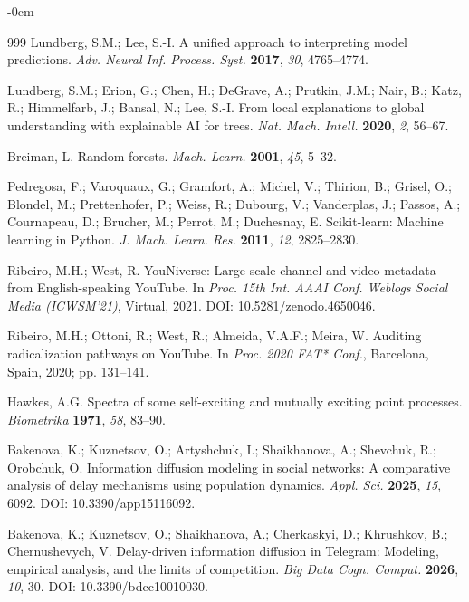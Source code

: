 \documentclass[journal,article,submit,pdftex,moreauthors]{Definitions/mdpi}
\begin{document}
\begin{adjustwidth}{-\extralength}{0cm}
\begin{thebibliography}{999}
Lundberg, S.M.; Lee, S.-I. A unified approach to interpreting model
predictions. {\em Adv. Neural Inf. Process. Syst.} {\bf 2017},
{\em 30}, 4765--4774.

Lundberg, S.M.; Erion, G.; Chen, H.; DeGrave, A.; Prutkin, J.M.;
Nair, B.; Katz, R.; Himmelfarb, J.; Bansal, N.; Lee, S.-I.
From local explanations to global understanding with explainable AI for
trees. {\em Nat. Mach. Intell.} {\bf 2020}, {\em 2}, 56--67.

Breiman, L. Random forests. {\em Mach. Learn.} {\bf 2001}, {\em 45},
5--32.

Pedregosa, F.; Varoquaux, G.; Gramfort, A.; Michel, V.; Thirion, B.;
Grisel, O.; Blondel, M.; Prettenhofer, P.; Weiss, R.; Dubourg, V.;
Vanderplas, J.; Passos, A.; Cournapeau, D.; Brucher, M.; Perrot, M.;
Duchesnay, E. Scikit-learn: Machine learning in Python.
{\em J. Mach. Learn. Res.} {\bf 2011}, {\em 12}, 2825--2830.

Ribeiro, M.H.; West, R. YouNiverse: Large-scale channel and video metadata
from English-speaking YouTube. In {\em Proc. 15th Int. AAAI Conf. Weblogs
Social Media (ICWSM'21)}, Virtual, 2021.
DOI: 10.5281/zenodo.4650046.

Ribeiro, M.H.; Ottoni, R.; West, R.; Almeida, V.A.F.; Meira, W.
Auditing radicalization pathways on YouTube. In {\em Proc. 2020 FAT*
Conf.}, Barcelona, Spain, 2020; pp. 131--141.

Hawkes, A.G. Spectra of some self-exciting and mutually exciting point
processes. {\em Biometrika} {\bf 1971}, {\em 58}, 83--90.

Bakenova, K.; Kuznetsov, O.; Artyshchuk, I.; Shaikhanova, A.;
Shevchuk, R.; Orobchuk, O. Information diffusion modeling in social
networks: A comparative analysis of delay mechanisms using population
dynamics. {\em Appl. Sci.} {\bf 2025}, {\em 15}, 6092.
DOI: 10.3390/app15116092.

Bakenova, K.; Kuznetsov, O.; Shaikhanova, A.; Cherkaskyi, D.;
Khrushkov, B.; Chernushevych, V.
Delay-driven information diffusion in Telegram: Modeling, empirical
analysis, and the limits of competition.
{\em Big Data Cogn. Comput.} {\bf 2026}, {\em 10}, 30.
DOI: 10.3390/bdcc10010030.

\end{thebibliography}



\end{adjustwidth}
\end{document}
